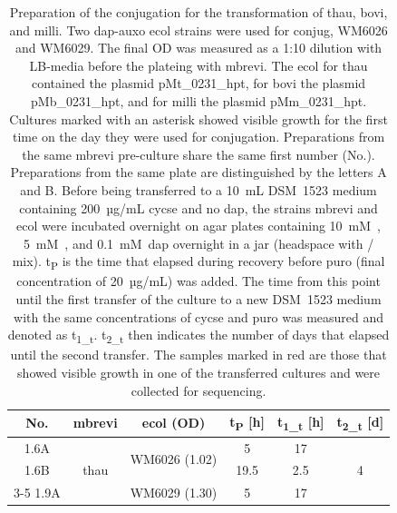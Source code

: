 
\begin{table}[ht]
	\centering
	\caption[Preparation of the conjugation for the transformation of \acrlong{thau}, \acrlong{bovi}, and \acrlong{milli}.]{Preparation of the conjugation for the transformation of \acrlong{thau}, \acrlong{bovi}, and \acrlong{milli}. Two \acrshort{dap}-\gls{auxo} \acrlong{ecol} strains were used for \gls{conjug}, WM6026 and WM6029. The final \acrshort{OD} was measured as a 1:10 dilution with LB-media before the \gls{plateing} with \acrlong{mbrevi}. The \acrshort{ecol} for \acrshort{thau} contained the plasmid pMt\_0231\_hpt, for \acrshort{bovi} the plasmid pMb\_0231\_hpt, and for \acrshort{milli} the plasmid pMm\_0231\_hpt. Cultures marked with an asterisk showed visible growth for the first time on the day they were used for conjugation. Preparations from the same \acrlong{mbrevi} pre-culture share the same first number (No.). Preparations from the same plate are distinguished by the letters A and B. Before being transferred to a 10~mL DSM~1523 medium containing 200~µg/mL \acrfull{cycse} and no \acrshort{dap}, the strains \acrlong{mbrevi} and \acrshort{ecol} were incubated overnight on agar plates containing 10~mM~, 5~mM~, and 0.1~mM~\acrshort{dap} overnight in a jar (headspace with / mix). t\textsubscript{P} is the time that elapsed during recovery before \acrshort{puro} (final concentration of 20~µg/mL) was added. The time from this point until the first transfer of the culture to a new DSM~1523 medium with the same concentrations of \acrshort{cycse} and \acrshort{puro} was measured and denoted as t\textsubscript{1\_t}. t\textsubscript{2\_t} then indicates the number of days that elapsed until the second transfer. The samples marked in red are those that showed visible growth in one of the transferred cultures and were collected for sequencing.}
	\label{tab:conjugation_preparation}
	\begin{tabular}{cccccc}
		\toprule
		No. & \acrlong{mbrevi} & \acrshort{ecol} (\acrshort{OD}) & t\textsubscript{P} [h] &  t\textsubscript{1\_t} [h] & t\textsubscript{2\_t} [d]\\
		\midrule
		1.6A & \multirow{4}{*}{\acrshort{thau}} &\multirow{2}{*}{WM6026 (1.02)} & 5 & 17 & \multirow{4}{*}{4} \\
		1.6B & & & 19.5 & 2.5& \\
		\cline{3-5}
		1.9A & & \multirow{2}{*}{WM6029 (1.30)} & 5 & 17& \\

\end{tabular}
\end{table}
